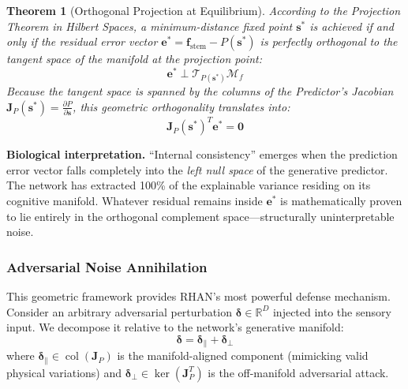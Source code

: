 \documentclass[12pt,a4paper]{article}
\newtheorem{theorem}{Theorem}[section]
\begin{document}
\begin{theorem}[Orthogonal Projection at Equilibrium]
\label{thm:orthogonal}
According to the Projection Theorem in Hilbert Spaces, a minimum-distance
fixed point $\mathbf{s}^*$ is achieved if and only if the residual error
vector $\mathbf{e}^* = \mathbf{f}_{\mathrm{stem}} - P(\mathbf{s}^*)$ is
perfectly orthogonal to the tangent space of the manifold at the projection
point:
\begin{equation}
  \mathbf{e}^* \perp \mathcal{T}_{P(\mathbf{s}^*)}\mathcal{M}_f
\end{equation}
Because the tangent space is spanned by the columns of the Predictor's
Jacobian $\mathbf{J}_P(\mathbf{s}^*) = \frac{\partial P}{\partial \mathbf{s}}$,
this geometric orthogonality translates into:
\begin{equation}
  \mathbf{J}_P(\mathbf{s}^*)^T \mathbf{e}^* = \mathbf{0}
  \label{eq:null_space}
\end{equation}
\end{theorem}

\textbf{Biological interpretation.} ``Internal consistency'' emerges when the
prediction error vector falls completely into the \textit{left null space} of
the generative predictor. The network has extracted 100\% of the explainable
variance residing on its cognitive manifold. Whatever residual remains inside
$\mathbf{e}^*$ is mathematically proven to lie entirely in the orthogonal
complement space---structurally uninterpretable noise.

\subsubsection{Adversarial Noise Annihilation}

This geometric framework provides RHAN's most powerful defense mechanism.
Consider an arbitrary adversarial perturbation
$\bm{\delta} \in \mathbb{R}^D$ injected into the sensory input. We decompose
it relative to the network's generative manifold:
\begin{equation}
  \bm{\delta} = \bm{\delta}_{\parallel} + \bm{\delta}_{\perp}
\end{equation}
where $\bm{\delta}_{\parallel} \in \operatorname{col}(\mathbf{J}_P)$ is the
manifold-aligned component (mimicking valid physical variations) and
$\bm{\delta}_{\perp} \in \ker(\mathbf{J}_P^T)$ is the off-manifold
adversarial attack.
\end{document}
